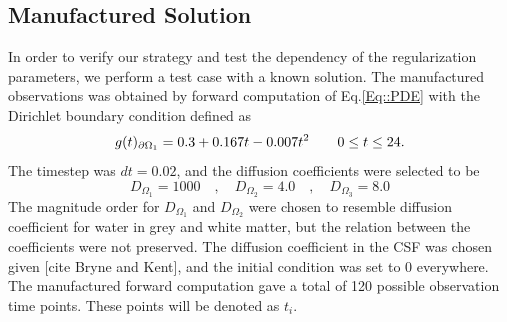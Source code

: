 \documentclass[11pt,a4paper]{article}
\begin{document}
\subsection{Manufactured Solution}
In order to verify our strategy and test the dependency of the
regularization parameters, we perform a test case with a
known solution.  
The manufactured observations was obtained by forward computation of Eq.\ref{Eq::PDE} with the Dirichlet boundary condition defined as
\begin{equation}
g(t)_{\partial \Omega_1} = 0.3 +0.167t - 0.007t\sp{2} \qquad  0 \leq t \leq 24.
\label{EQ::DIRI}
\end{equation}
The timestep was $dt = 0.02$, and the diffusion coefficients were selected to be 
\begin{equation}
D_{\Omega_1} = 1000 \quad , \quad D_{\Omega_2} = 4.0 \quad , \quad D_{\Omega_3} = 8.0 
\end{equation}  
The magnitude order for $D_{\Omega_1} $ and $D_{\Omega_2}$ were chosen to resemble diffusion coefficient for water in grey and white matter, but the relation between the coefficients were not preserved. The diffusion coefficient in the CSF was chosen given [cite Bryne and Kent], and the initial condition was set to 0 everywhere. %
The manufactured forward computation gave a total of 120 possible observation time points. These points will be denoted as $t_i$.
\end{document}
